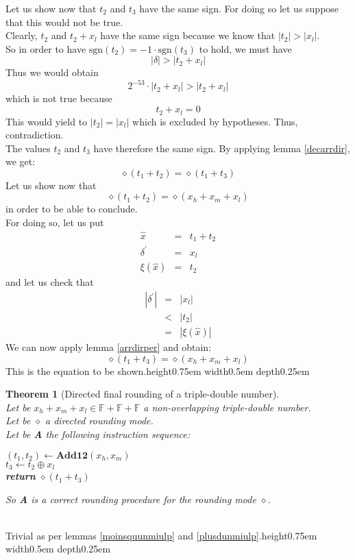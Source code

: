 \documentclass[a4paper,10pt,twoside]{article}
\newtheorem{theorem}{Theorem}[section]
\newenvironment{proof}[1][Proof]{\begin{trivlist}
\item[\hskip \labelsep {\bfseries #1}]}{\end{trivlist}}
\newcommand{\qed}{\nobreak \ifvmode \relax \else \ifdim \lastskip<1.5em \hskip-\lastskip
\hskip1.5em plus0em minus0.5em \fi \nobreak \vrule height0.75em width0.5em depth0.25em\fi}
\newcommand{\F}{\ensuremath{\mathbb {F}}}
\newcommand{\hi}{\ensuremath{\mathit{h}}}
\newcommand{\mi}{\ensuremath{\mathit{m}}}
\newcommand{\lo}{\ensuremath{\mathit{l}}}
\newcommand{\mAdd}{\ensuremath{\mathbf{Add12}}}
\newcommand{\sgn}{\ensuremath{\mathrm{sgn}}}
\begin{document}
\begin{proof}
Let us show now that $t_2$ and $t_3$ have the same sign. For doing so let us suppose that this would not be true.\\
Clearly, $t_2$ and $t_2 + x_\lo$ have the same sign because we know that
$\left \vert t_2 \right \vert > \left \vert x_\lo \right \vert$. \\
So in order to have $\sgn\left( t_2 \right) = -1 \cdot \sgn\left( t_3 \right)$ to hold, we must have
$$\left \vert \delta \right \vert > \left \vert t_2 + x_\lo \right \vert$$
Thus we would obtain
$$2^{-53} \cdot \left \vert t_2 + x_\lo \right \vert > \left \vert t_2 + x_\lo \right \vert$$
which is not true because
$$t_2 + x_\lo = 0$$
This would yield to $\left \vert t_2 \right \vert = \left \vert x_\lo \right \vert$ which is excluded by hypotheses.
Thus, contradiction. \\
The values $t_2$ and $t_3$ have therefore the same sign. By applying lemma \ref{decarrdir}, we get:
$$\diamond \left( t_1 + t_2 \right) = \diamond \left( t_1 + t_3 \right)$$
Let us show now that
$$\diamond \left( t_1 + t_2 \right) = \diamond \left( x_\hi + x_\mi + x_\lo \right)$$
in order to be able to conclude. \\
For doing so, let us put
\begin{eqnarray*}
\hat{x} & = & t_1 + t_2 \\
\delta^\prime & = & x_\lo \\
\xi\left( \hat{x} \right) & = & t_2
\end{eqnarray*}
and let us check that
\begin{eqnarray*}
\left \vert \delta^\prime \right \vert
& = & \left \vert x_\lo \right \vert \\
& < & \left \vert t_2 \right \vert \\
& = & \left \vert \xi\left(\hat{x}\right) \right \vert
\end{eqnarray*}
We can now apply lemma \ref{arrdirper} and obtain:
$$\diamond \left( t_1 + t_3 \right) = \diamond \left( x_\hi + x_\mi + x_\lo \right)$$
This is the equation to be shown.\qed
\end{proof}
\begin{theorem}[Directed final rounding of a triple-double number] \label{arrdir} ~ \\
Let be $x_\hi + x_\mi + x_\lo \in \F + \F + \F$ a non-overlapping triple-double number. \\
Let be $\diamond$ a directed rounding mode.\\
Let be {\bf A} the following instruction sequence:
\begin{center}
\begin{minipage}[b]{50mm}
$\left( t_1, t_2 \right) \gets \mAdd\left( x_\hi, x_\mi \right)$ \\
$t_3 \gets t_2 \oplus x_\lo$ \\
{\bf return } $\diamond\left( t_1 + t_3 \right)$
\end{minipage}
\end{center}
So {\bf A} is a correct rounding procedure for the rounding mode $\diamond$.
\end{theorem}
\begin{proof} ~\\
Trivial as per lemmas \ref{moinsquunmiulp} and \ref{plusdunmiulp}.\qed
\end{proof}


\end{document}

